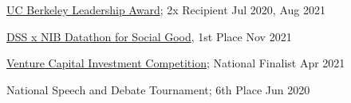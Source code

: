 \href{https://alumni.berkeley.edu/community/scholarships/leadership-award}{UC Berkeley Leadership Award}; 2x Recipient \hfill Jul 2020, Aug 2021 \par
\href{https://www.facebook.com/events/933047190947185?}{DSS x NIB Datathon for Social Good}, 1st Place \hfill Nov 2021\par
\href{https://www.vcic.org/}{Venture Capital Investment Competition}; National Finalist \hfill Apr 2021\par
National Speech and Debate Tournament; 6th Place \hfill Jun 2020 \par